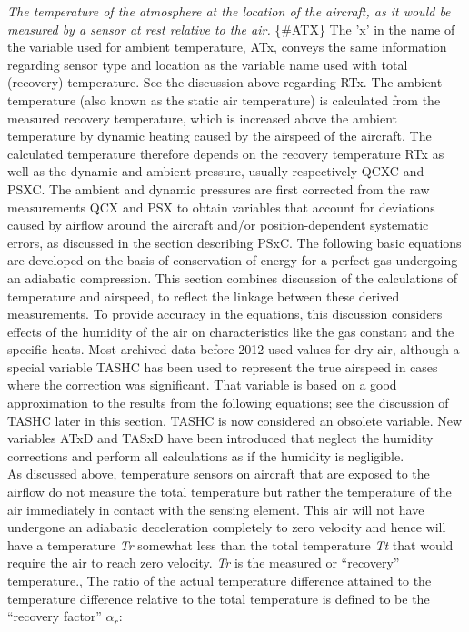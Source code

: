 \documentclass[
]{book}
\begin{document}
\emph{The temperature of the atmosphere at the location of the aircraft, as it would be measured by a sensor at rest relative to the air.} \{\#ATX\}
The 'x' in the name of the variable used for ambient temperature, ATx, conveys the same information regarding sensor type and location as the variable name used with total (recovery) temperature. See the discussion above regarding RTx. The ambient temperature (also known as the static air temperature) is calculated from the measured recovery temperature, which is increased above the ambient temperature by dynamic heating caused by the airspeed of the aircraft. The calculated temperature therefore depends on the recovery temperature RTx as well as the dynamic and ambient pressure, usually respectively QCXC and PSXC. The ambient and dynamic pressures are first corrected from the raw measurements QCX and PSX to obtain variables that account for deviations caused by airflow around the aircraft and/or position-dependent systematic errors, as discussed in the section describing PSxC. The following basic equations are developed on the basis of conservation of energy for a perfect gas undergoing an adiabatic compression.
This section combines discussion of the calculations of temperature and airspeed, to reflect the linkage between these derived measurements. To provide accuracy in the equations, this discussion considers effects of the humidity of the air on characteristics like the gas constant and the specific heats. Most archived data before 2012 used values for dry air, although a special variable TASHC has been used to represent the true airspeed in cases where the correction was significant. That variable is based on a good approximation to the results from the following equations; see the discussion of TASHC later in this section. TASHC is now considered an obsolete variable. New variables ATxD and TASxD have been introduced that neglect the humidity corrections and perform all calculations as if the humidity is negligible.
\\
As discussed above, temperature sensors on aircraft that are exposed to the airflow do not measure the total temperature but rather the temperature of the air immediately in contact with the sensing element. This air will not have undergone an adiabatic deceleration completely to zero velocity and hence will have a temperature {\emph{T}\emph{r}} somewhat less than the total temperature {\emph{T}\emph{t}} that would require the air to reach zero velocity. {\emph{T}\emph{r}} is the measured or ``recovery'' temperature., The ratio of the actual temperature difference attained to the temperature difference relative to the total temperature is defined to be the ``recovery factor'' \(\alpha_r\):
\end{document}
